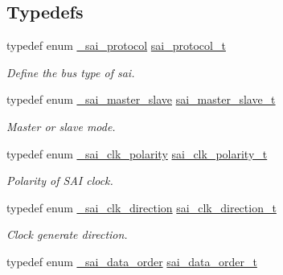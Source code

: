 \subsection*{Typedefs}
\begin{DoxyCompactItemize}
\item 
typedef enum \hyperlink{group__sai__hal_ga5a56e024c1155a61c6f46513e57b473f}{\+\_\+sai\+\_\+protocol} \hyperlink{group__sai__hal_ga2f1f1a725e4d1540d8dfccbdaed66b26}{sai\+\_\+protocol\+\_\+t}\hypertarget{group__sai__hal_ga2f1f1a725e4d1540d8dfccbdaed66b26}{}\label{group__sai__hal_ga2f1f1a725e4d1540d8dfccbdaed66b26}

\begin{DoxyCompactList}\small\item\em Define the bus type of sai. \end{DoxyCompactList}\item 
typedef enum \hyperlink{group__sai__hal_gab94a8b97a2fa0881a3259d1f514fcf40}{\+\_\+sai\+\_\+master\+\_\+slave} \hyperlink{group__sai__hal_ga90144d956adefe0eaf778868dd06dab4}{sai\+\_\+master\+\_\+slave\+\_\+t}\hypertarget{group__sai__hal_ga90144d956adefe0eaf778868dd06dab4}{}\label{group__sai__hal_ga90144d956adefe0eaf778868dd06dab4}

\begin{DoxyCompactList}\small\item\em Master or slave mode. \end{DoxyCompactList}\item 
typedef enum \hyperlink{group__sai__hal_ga336516f5afeec0ab04b69f7a2efbc3cc}{\+\_\+sai\+\_\+clk\+\_\+polarity} \hyperlink{group__sai__hal_ga263ddf42662e606be8ea6813c257f9f8}{sai\+\_\+clk\+\_\+polarity\+\_\+t}\hypertarget{group__sai__hal_ga263ddf42662e606be8ea6813c257f9f8}{}\label{group__sai__hal_ga263ddf42662e606be8ea6813c257f9f8}

\begin{DoxyCompactList}\small\item\em Polarity of S\+AI clock. \end{DoxyCompactList}\item 
typedef enum \hyperlink{group__sai__hal_ga249de9addcc563f1e381e4d46776e9a9}{\+\_\+sai\+\_\+clk\+\_\+direction} \hyperlink{group__sai__hal_ga52974b0818e0e5a38b1f7043e91f7185}{sai\+\_\+clk\+\_\+direction\+\_\+t}\hypertarget{group__sai__hal_ga52974b0818e0e5a38b1f7043e91f7185}{}\label{group__sai__hal_ga52974b0818e0e5a38b1f7043e91f7185}

\begin{DoxyCompactList}\small\item\em Clock generate direction. \end{DoxyCompactList}\item 
typedef enum \hyperlink{group__sai__hal_ga835cf95188e9d76d02b573d525e6447a}{\+\_\+sai\+\_\+data\+\_\+order} \hyperlink{group__sai__hal_ga6c09c5ee1699b834bcdcf38b0aaa579e}{sai\+\_\+data\+\_\+order\+\_\+t}\hypertarget{group__sai__hal_ga6c09c5ee1699b834bcdcf38b0aaa579e}{}\label{group__sai__hal_ga6c09c5ee1699b834bcdcf38b0aaa579e}


\end{DoxyCompactItemize}
